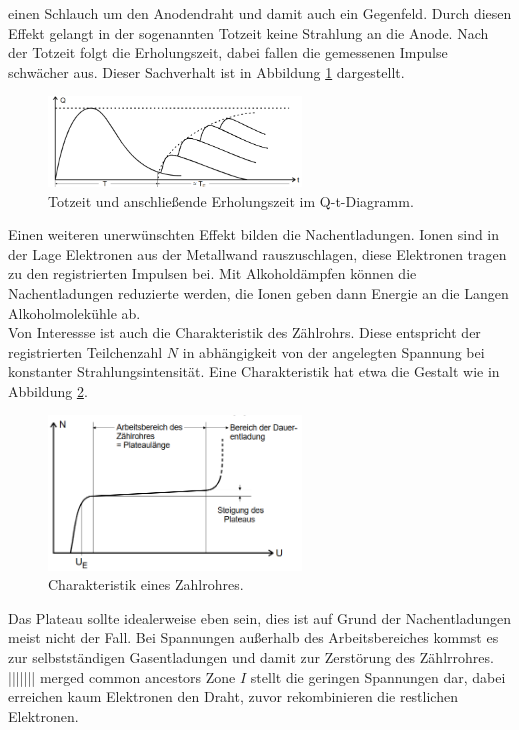 einen Schlauch um den Anodendraht und damit auch ein Gegenfeld. Durch diesen Effekt gelangt in der sogenannten Totzeit keine Strahlung
an die Anode. Nach der Totzeit folgt die Erholungszeit, dabei fallen die gemessenen Impulse schwächer aus. Dieser Sachverhalt ist in Abbildung
\ref{fig:totzeit} dargestellt.
\begin{figure}
  \centering
  \includegraphics[width=0.6\textwidth]{tz.PNG}
  \caption{Totzeit und anschließende Erholungszeit im Q-t-Diagramm.}
  \label{fig:totzeit}
\end{figure}
Einen weiteren unerwünschten Effekt bilden die Nachentladungen. Ionen sind in der Lage Elektronen aus der Metallwand rauszuschlagen,
diese Elektronen tragen zu den registrierten Impulsen bei. Mit Alkoholdämpfen können die Nachentladungen reduzierte werden, die
Ionen geben dann Energie an die Langen Alkoholmolekühle ab.\\
Von Interessse ist auch die Charakteristik des Zählrohrs. Diese entspricht der registrierten Teilchenzahl $N$ in abhängigkeit von der
angelegten Spannung bei konstanter Strahlungsintensität. Eine Charakteristik hat etwa die Gestalt wie in Abbildung \ref{fig:char}.
\begin{figure}
  \centering
  \includegraphics[width=0.6\textwidth]{char.PNG}
  \caption{Charakteristik eines Zahlrohres.}
  \label{fig:char}
\end{figure}
Das Plateau sollte idealerweise eben sein, dies ist auf Grund der Nachentladungen meist nicht der Fall.
Bei Spannungen außerhalb des Arbeitsbereiches kommst es zur selbstständigen Gasentladungen und damit zur Zerstörung des Zählrrohres.
||||||| merged common ancestors
Zone $I$ stellt die geringen Spannungen dar, dabei erreichen kaum Elektronen den Draht, zuvor rekombinieren die restlichen Elektronen.

